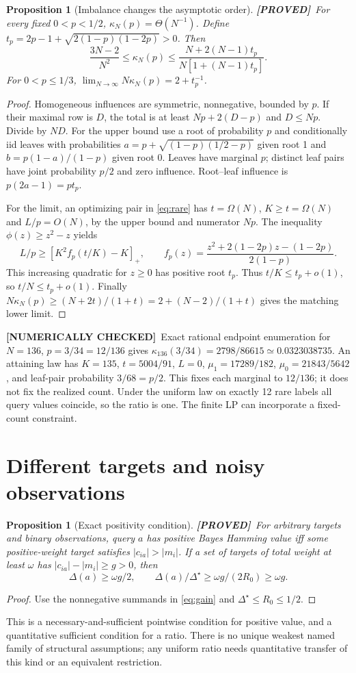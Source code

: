 \documentclass[11pt]{article}
\newtheorem{proposition}[theorem]{Proposition}
\theoremstyle{definition}
\newcommand{\1}{\mathbf 1}
\newcommand{\pr}{\textbf{[PROVED]}}
\newcommand{\nc}{\textbf{[NUMERICALLY CHECKED]}}
\begin{document}
\begin{proposition}[Imbalance changes the asymptotic order]\label{prop:rareorder}
\pr\ For every fixed $0<p<1/2$, $\kappa_N(p)=\Theta(N^{-1})$.
Define $t_p=2p-1+\sqrt{2(1-p)(1-2p)}>0$. Then
\[
 \frac{3N-2}{N^2}\le\kappa_N(p)
 \le\frac{N+2(N-1)t_p}{N[1+(N-1)t_p]}.
\]
For $0<p\le1/3$,
$\lim_{N\to\infty}N\kappa_N(p)=2+t_p^{-1}$.
\end{proposition}
\begin{proof}
Homogeneous influences are symmetric, nonnegative, bounded by $p$.
If their maximal row is $D$, the total is at least $Np+2(D-p)$ and
$D\le Np$. Divide by $ND$.
For the upper bound use a root of probability $p$ and conditionally iid
leaves with probabilities
$a=p+\sqrt{(1-p)(1/2-p)}$ given root 1 and
$b=p(1-a)/(1-p)$ given root 0.
Leaves have marginal $p$; distinct leaf pairs have joint probability $p/2$
and zero influence. Root--leaf influence is $p(2a-1)=pt_p$.

For the limit, an optimizing pair in \eqref{eq:rare} has $t=\Omega(N)$,
$K\ge t=\Omega(N)$ and $L/p=O(N)$, by the upper bound and numerator $Np$.
The inequality $\phi(z)\ge z^2-z$ yields
\[
 L/p\ge[K^2 f_p(t/K)-K]_+,\qquad
 f_p(z)=\frac{z^2+2(1-2p)z-(1-2p)}{2(1-p)}.
\]
This increasing quadratic for $z\ge0$ has positive root $t_p$.
Thus $t/K\le t_p+o(1)$, so $t/N\le t_p+o(1)$.
Finally $N\kappa_N(p)\ge(N+2t)/(1+t)
=2+(N-2)/(1+t)$ gives the matching lower limit.
\end{proof}
\nc\ Exact rational endpoint enumeration for $N=136$, $p=3/34=12/136$
gives $\kappa_{136}(3/34)=2798/86615\simeq0.0323038735$.
An attaining law has $K=135$, $t=5004/91$, $L=0$,
$\mu_1=17289/182$, $\mu_0=21843/5642$, and leaf-pair probability $3/68=p/2$.
This fixes each marginal to $12/136$; it does not fix the realized count.
Under the uniform law on exactly 12 rare labels all query values coincide,
so the ratio is one. The finite LP can incorporate a fixed-count constraint.

\section{Different targets and noisy observations}
\begin{proposition}[Exact positivity condition]\label{prop:transfer}
\pr\ For arbitrary targets and binary observations, query $a$ has positive
Bayes Hamming value iff some positive-weight target satisfies
$|c_{ia}|>|m_i|$. If a set of targets of total weight at least $\omega$
has $|c_{ia}|-|m_i|\ge g>0$, then
\[
 \Delta(a)\ge\omega g/2,\qquad
 \Delta(a)/\Delta^\star\ge\omega g/(2R_0)\ge\omega g.
\]
\end{proposition}
\begin{proof}
Use the nonnegative summands in \eqref{eq:gain} and
$\Delta^\star\le R_0\le1/2$.
\end{proof}
This is a necessary-and-sufficient pointwise condition for positive value,
and a quantitative sufficient condition for a ratio. There is no unique
weakest named family of structural assumptions; any uniform ratio needs
quantitative transfer of this kind or an equivalent restriction.
\end{document}
